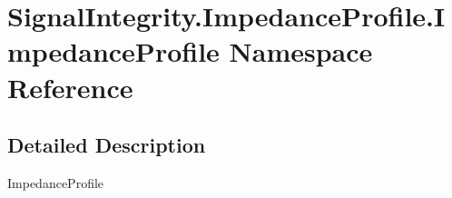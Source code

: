 \hypertarget{namespaceSignalIntegrity_1_1ImpedanceProfile_1_1ImpedanceProfile}{}\section{Signal\+Integrity.\+Impedance\+Profile.\+Impedance\+Profile Namespace Reference}
\label{namespaceSignalIntegrity_1_1ImpedanceProfile_1_1ImpedanceProfile}


\subsection{Detailed Description}
\begin{DoxyVerb}ImpedanceProfile\end{DoxyVerb}
 